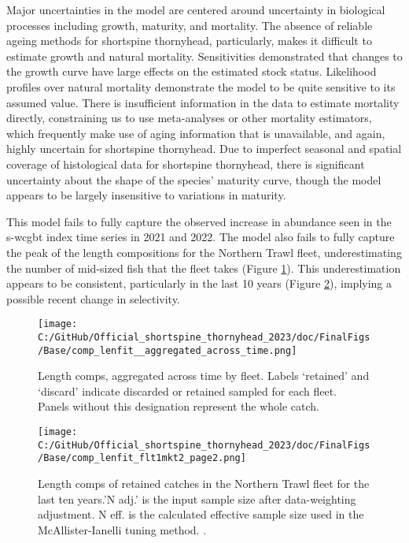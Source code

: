 \documentclass[11pt,
  english,
  letterpaper,
]{article}
\begin{document}
Major uncertainties in the model are centered around uncertainty in biological processes including growth, maturity, and mortality. The absence of reliable ageing methods for shortspine thornyhead, particularly, makes it difficult to estimate growth and natural mortality. Sensitivities demonstrated that changes to the growth curve have large effects on the estimated stock status. Likelihood profiles over natural mortality demonstrate the model to be quite sensitive to its assumed value. There is insufficient information in the data to estimate mortality directly, constraining us to use meta-analyses or other mortality estimators, which frequently make use of aging information that is unavailable, and again, highly uncertain for shortspine thornyhead. Due to imperfect seasonal and spatial coverage of histological data for shortspine thornyhead, there is significant uncertainty about the shape of the species' maturity curve, though the model appears to be largely insensitive to variations in maturity.

This model fails to fully capture the observed increase in abundance seen in the \gls{s-wcgbt} index time series in 2021 and 2022. The model also fails to fully capture the peak of the length compositions for the Northern Trawl fleet, underestimating the number of mid-sized fish that the fleet takes (Figure \ref{fig:lencomp_all}). This underestimation appears to be consistent, particularly in the last 10 years (Figure \ref{fig:lencomp_Nt_2}), implying a possible recent change in selectivity.

\begin{figure}
\centering
\texttt{[image: C:/GitHub/Official\_shortspine\_thornyhead\_2023/doc/FinalFigs/Base/comp\_lenfit\_\_aggregated\_across\_time.png]}
\caption{Length comps, aggregated across time by fleet. Labels `retained' and `discard' indicate discarded or retained sampled for each fleet. Panels without this designation represent the whole catch.\label{fig:lencomp_all}}
\end{figure}

\begin{figure}
\centering
\texttt{[image: C:/GitHub/Official\_shortspine\_thornyhead\_2023/doc/FinalFigs/Base/comp\_lenfit\_flt1mkt2\_page2.png]}
\caption{Length comps of retained catches in the Northern Trawl fleet for the last ten years.'N adj.' is the input sample size after data-weighting adjustment. N eff. is the calculated effective sample size used in the McAllister-Ianelli tuning method. .\label{fig:lencomp_Nt_2}}
\end{figure}
\end{document}
